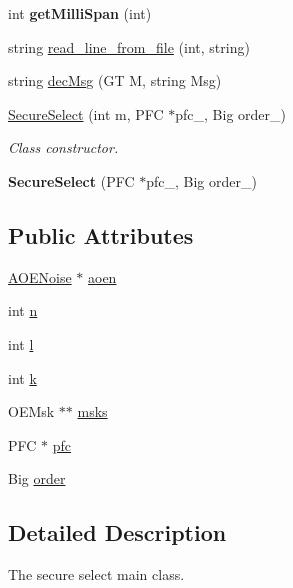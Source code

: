 \begin{DoxyCompactItemize}
\item 
\hypertarget{classSecureSelect_a8b3934a352f33f8ca62d6ebe13e1c530}{int {\bfseries get\-Milli\-Span} (int)}\label{classSecureSelect_a8b3934a352f33f8ca62d6ebe13e1c530}

\item 
string \hyperlink{classSecureSelect_adf030b491e451b677f574098c9710327}{read\-\_\-line\-\_\-from\-\_\-file} (int, string)
\item 
string \hyperlink{classSecureSelect_a58b6ca8e574976a632d8f862b939b877}{dec\-Msg} (G\-T M, string Msg)
\item 
\hyperlink{classSecureSelect_a88cd629de7214c05eb86683b058bacd5}{Secure\-Select} (int m, P\-F\-C $\ast$pfc\-\_\-, Big order\-\_\-)
\begin{DoxyCompactList}\small\item\em Class constructor. \end{DoxyCompactList}\item 
\hypertarget{classSecureSelect_a3270108d70fee40d40a28ebccee7ed2a}{{\bfseries Secure\-Select} (P\-F\-C $\ast$pfc\-\_\-, Big order\-\_\-)}\label{classSecureSelect_a3270108d70fee40d40a28ebccee7ed2a}

\end{DoxyCompactItemize}
\subsection*{Public Attributes}
\begin{DoxyCompactItemize}
\item 
\hyperlink{classAOENoise}{A\-O\-E\-Noise} $\ast$ \hyperlink{classSecureSelect_ace499f63f2609b19c429bee5638db42d}{aoen}
\item 
int \hyperlink{classSecureSelect_a0834ef0de36dad948cec8d54fc89aada}{n}
\item 
int \hyperlink{classSecureSelect_a010ed62263ff19f8b07dfaa298962f24}{l}
\item 
int \hyperlink{classSecureSelect_aa9172d68f4a5f9aef784703878e2c352}{k}
\item 
O\-E\-Msk $\ast$$\ast$ \hyperlink{classSecureSelect_a8f1233a931a2dce84a7f9588721d8301}{msks}
\item 
P\-F\-C $\ast$ \hyperlink{classSecureSelect_acd8fd34bdde543ca9711ac5e266a094d}{pfc}
\item 
Big \hyperlink{classSecureSelect_ac97b5a9177b47f64f49891feb67b69b2}{order}
\end{DoxyCompactItemize}


\subsection{Detailed Description}
The secure select main class. 

